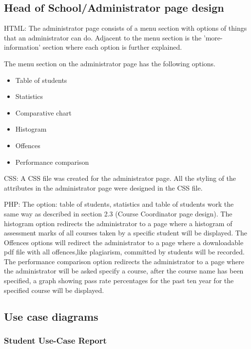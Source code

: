 \subsection{Head of School/Administrator page design}

HTML: The administrator page consists of a menu section with options of things that an  administrator can do. Adjacent to the menu section is the 'more-information' section where each option is further explained. 

The menu section on the administrator page has the following options. 

\begin{itemize}
\item Table of students
\item Statistics
\item Comparative chart
\item Histogram
\item Offences
\item Performance comparison
\end{itemize}

CSS: A CSS file was created for the administrator page. All the styling of the attributes in the administrator page were designed in the CSS file. 

PHP: The option: table of students, statistics and table of students work the same way as described in section 2.3 (Course Coordinator page design). The histogram option redirects the administrator to a page where a histogram of assessment marks of all courses taken by a specific student will be displayed. The Offences options will redirect the administrator to a page where a downloadable pdf file with all offences,like plagiarism, committed by students will be recorded. The performance comparison option redirects the administrator to a page where the administrator will be asked specify a course, after the course name has been specified, a graph showing pass rate percentages for the past ten year for the specified course will be displayed.      


\subsection{Use case diagrams}



\subsubsection{Student Use-Case Report}$\;\;\;\;\;\;\;\;\;\;\;\;\;\;\;\;\;\;\;\;\;\;\;$
	
